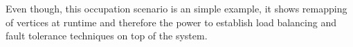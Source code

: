 \noindent Even though, this occupation scenario is an simple example, it
shows remapping of vertices at runtime and therefore the power
to establish load balancing and fault tolerance techniques on
top of the system.

\cleardoublepage

